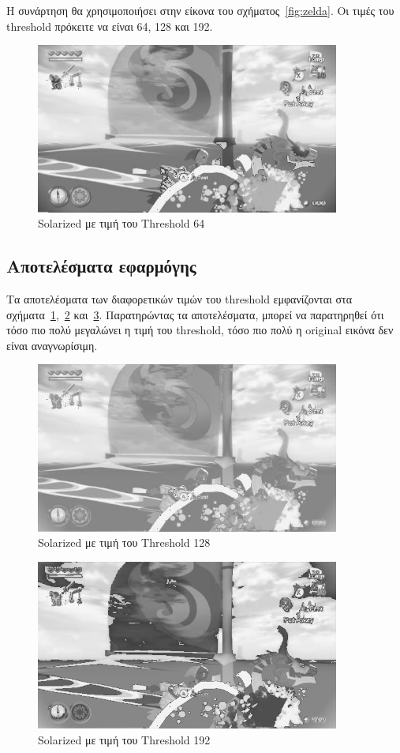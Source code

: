 Η συνάρτηση θα χρησιμοποιήσει στην είκονα του σχήματος~\ref{fig:zelda}. Οι τιμές του threshold πρόκειτε να είναι 64, 128 και 192.

\begin{figure}[th]
	\centering
	\includegraphics[width=100mm]{Figures/threshold_64}
	\caption[The Legend of Zelda - Windwaker HD Solarized 64 Threshold]{Solarized με τιμή του Threshold 64}
	\label{fig:threshold_64}
\end{figure}

\newpage
\subsection{Αποτελέσματα εφαρμόγης}

Τα αποτελέσματα των διαφορετικών τιμών του threshold εμφανίζονται στα σχήματα~\ref{fig:threshold_64},~\ref{fig:threshold_128} και~\ref{fig:threshold_192}.
Παρατηρώντας τα αποτελέσματα, μπορεί να παρατηρηθεί ότι τόσο πιο πολύ μεγαλώνει η τιμή του threshold, τόσο πιο πολύ η original εικόνα δεν είναι αναγνωρίσιμη.

\begin{figure}[th]
	\centering
	\includegraphics[width=100mm]{Figures/threshold_128}
	\caption[The Legend of Zelda - Windwaker HD Solarized 128 Threshold]{Solarized με τιμή του Threshold 128}
	\label{fig:threshold_128}
\end{figure}

\begin{figure}[th]
	\centering
	\includegraphics[width=100mm]{Figures/threshold_192}
	\caption[The Legend of Zelda - Windwaker HD Solarized 192 Threshold]{Solarized με τιμή του Threshold 192}
	\label{fig:threshold_192}
\end{figure}
